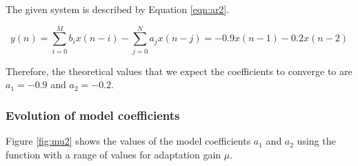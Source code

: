 \noindent
The given system is described by Equation \ref{eqn:ar2}.

\begin{equation}
y(n)=\sum_{i=0}^{M} b_{i} x(n-i)-\sum_{j=0}^{N} a_{j} x(n-j)=-0.9 x(n-1)-0.2 x(n-2)
\label{eqn:ar2}
\end{equation}

\noindent
Therefore, the theoretical values that we expect the coefficients to converge to are $a_1 = -0.9$ and $a_2 = -0.2$.

\subsubsection{Evolution of model coefficients}

Figure \ref{fig:mu2} shows the values of the model coefficients $a_1$ and $a_2$ using the  function with a range of values for adaptation gain $\mu$.


